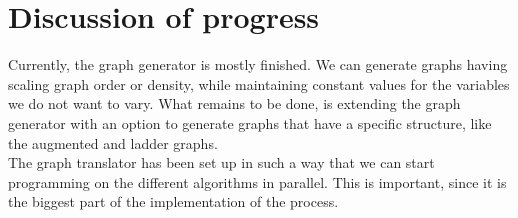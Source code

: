 \section{Discussion of progress}
Currently, the graph generator is mostly finished. We can generate graphs having scaling graph order or density, while maintaining constant values for the variables we do not want to vary. What remains to be done, is extending the graph generator with an option to generate graphs that have a specific structure, like the augmented and ladder graphs. \\

The graph translator has been set up in such a way that we can start programming on the different algorithms in parallel. This is important, since it is the biggest part of the implementation of the process.